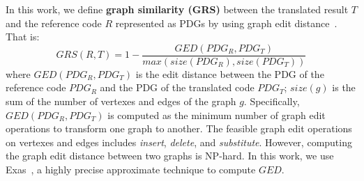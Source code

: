 In this work, we define \textbf{graph similarity (GRS)} between the
translated result $T$ and the reference code $R$ represented as PDGs
by using graph edit distance~\cite{sanfeliu}. That is:
$$GRS(R, T) = 1-\frac{GED(PDG_R, PDG_T)}{max\left(size(PDG_R),
  size(PDG_T)\right)}$$ where $GED(PDG_R, PDG_T)$ is the edit distance
between the PDG of the reference code $PDG_R$ and the PDG of the
translated code $PDG_T$; $size(g)$ is the sum of the number of
vertexes and edges of the graph $g$. Specifically, $GED(PDG_R, PDG_T)$
is computed as the minimum number of graph edit operations to
transform one graph to another. The feasible graph edit operations on
vertexes and edges includes {\em insert}, {\em delete}, and {\em
  substitute}.  However, computing the graph edit distance between two
graphs is NP-hard.  In this work, we use Exas~\cite{fase09}, a highly
precise approximate technique to compute $GED$.




